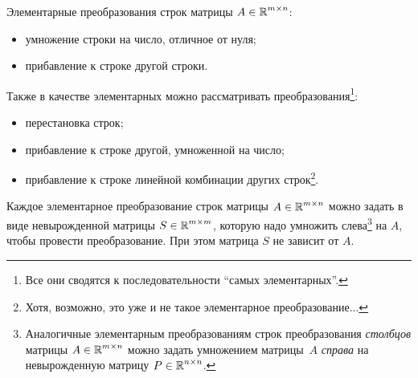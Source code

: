 \documentclass[a4paper,12pt]{article}
\begin{document}
    \begin{definition}
      Элементарные преобразования строк матрицы $A \in \operatorname{\mathbb R}^{m\times n}$:
      \begin{itemize}
        \item умножение строки на число, отличное от нуля;
        \item прибавление к строке другой строки.
      \end{itemize}
    \end{definition}
    
    Также в качестве элементарных можно рассматривать преобразования\footnote{Все они сводятся к последовательности ``самых элементарных''.}:
    \begin{itemize}
      \item перестановка строк;
      \item прибавление к строке другой, умноженной на число;
      \item прибавление к строке линейной комбинации других строк\footnote{Хотя, возможно, это уже и не такое элементарное преобразование...}.
    \end{itemize}
    
    \begin{proposition}
      Каждое элементарное преобразование строк матрицы $A \hm\in \RR^{m\times n}$ можно задать в виде невырожденной матрицы $S \hm\in \RR^{m \times m}$, которую надо умножить слева\footnote{Аналогичные элементарным преобразованиям строк преобразования \emph{столбцов} матрицы $A \hm\in \RR^{m\times n}$ можно задать умножением матрицы~$A$ \emph{справа} на невырожденную матрицу $P \hm\in \RR^{n \times n}$.} на $A$, чтобы провести преобразование.
      При этом матрица $S$ не зависит от $A$.
    \end{proposition}
    
\end{document}

